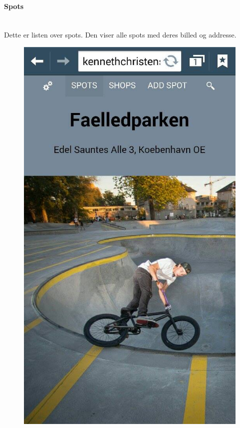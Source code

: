 \documentclass[12pt]{article}
\begin{document}
\newpage
\paragraph{Spots}\mbox{}\\
Dette er listen over spots. Den viser alle spots med deres billed og addresse.\\
\begin{figure}[h]
\includegraphics[scale = 0.3]{spot}
\end{figure}
\end{document}
